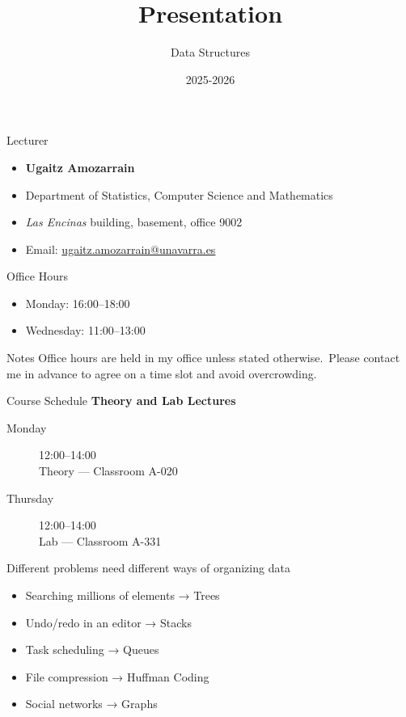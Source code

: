\documentclass[11pt]{beamer}
\author{Data Structures}
\title{\huge{Presentation}}
\date[]{2025-2026}
\begin{document}
\begin{frame}[plain]
	\maketitle
\end{frame}


\begin{frame}{Lecturer}
\begin{itemize}
\item \textbf{Ugaitz Amozarrain}
\item Department of Statistics, Computer Science and Mathematics
\item \emph{Las Encinas} building, basement, office 9002
\item Email: \href{mailto:ugaitz.amozarrain@unavarra.es}{ugaitz.amozarrain@unavarra.es}
\end{itemize}
\end{frame}


\begin{frame}{Office Hours}
\begin{itemize}
\item Monday: 16:00--18:00
\item Wednesday: 11:00--13:00
\end{itemize}
\vspace{0.3cm}
\begin{block}{Notes}
Office hours are held in my office unless stated otherwise.\
Please contact me in advance to agree on a time slot and avoid overcrowding.
\end{block}
\end{frame}


\begin{frame}{Course Schedule}
\textbf{Theory and Lab Lectures}
\vspace{0.3cm}
\begin{description}
\item[Monday] 12:00--14:00 \\
\quad Theory --- Classroom A-020
\item[Thursday] 12:00--14:00 \\
\quad Lab --- Classroom A-331
\end{description}
\end{frame}


\begin{frame}{Different problems need different ways of organizing data}
\begin{itemize}
\item Searching millions of elements → Trees
\item Undo/redo in an editor → Stacks
\item Task scheduling → Queues
\item File compression → Huffman Coding
\item Social networks → Graphs
\end{itemize}
\end{frame}
\end{document}
